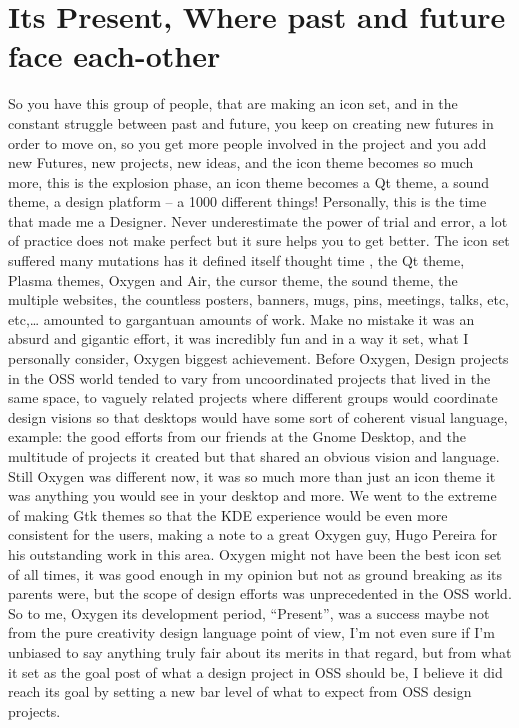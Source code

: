 {\section*{Its Present, Where past and future face each-other}
So you have this group of people, that are making an icon set, and in the constant struggle between past and future, you keep on creating new futures in order to move on, so you get more people involved in the project and you add new Futures, new projects, new ideas, and the icon theme becomes so much more, this is the explosion phase, an icon theme becomes a Qt theme, a sound theme, a design platform – a 1000 different things! 
Personally, this is the time that made me a Designer. Never underestimate the power of trial and error, a lot of practice does not make perfect but it sure helps you to get better.
The icon set suffered many mutations has it defined itself thought time , the Qt theme, Plasma themes, Oxygen and Air, the cursor theme, the sound theme, the multiple websites, the countless posters, banners, mugs, pins, meetings, talks, etc, etc,… amounted to gargantuan amounts of work. 
Make no mistake it was an absurd and gigantic effort, it was incredibly fun and in a way it set, what I personally consider, Oxygen biggest achievement.
Before Oxygen, Design projects in the OSS world tended to vary from uncoordinated projects that lived in the same space, to vaguely related projects where different groups would coordinate design visions so that desktops would have some sort of coherent visual language, example: the good efforts from our friends at the Gnome Desktop, and the multitude of projects it created but that shared an obvious vision and language.
Still Oxygen was different now, it was so much more than just an icon theme it was anything you would see in your desktop and more. We went to the extreme of making Gtk themes so that the KDE experience would be even more consistent for the users, making a note to a great Oxygen guy, Hugo Pereira for his outstanding work in this area.
Oxygen might not have been the best icon set of all times, it was good enough in my opinion but not as ground breaking as its parents were, but the scope of design efforts was unprecedented in the OSS world. 
So to me, Oxygen its development period, “Present”,  was a success maybe not from the pure creativity design language point of view, I'm not even sure if I'm unbiased to say anything truly fair about its merits in that regard, but from what it set as the goal post of what a design project in OSS should be, I believe it did reach its goal by setting a new bar level of what to expect from OSS design projects.

}
